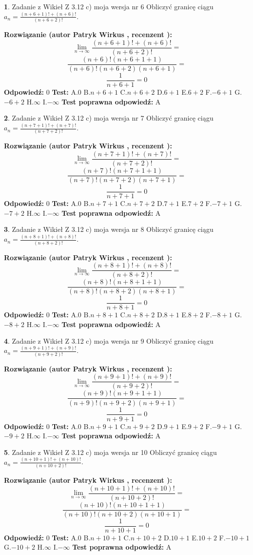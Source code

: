 \documentclass[12pt, a4paper]{article}
\theoremstyle{definition} %
\newtheorem{zad}{}
\newcommand{\zadStart}[1]{\begin{zad}#1\newline}
\newcommand{\zadStop}{\end{zad}}
\newcommand{\rozwStart}[2]{\noindent \textbf{Rozwiązanie (autor #1 , recenzent #2): }\newline}
\newcommand{\rozwStop}{\newline}
\newcommand{\odpStart}{\noindent \textbf{Odpowiedź:}\newline}
\newcommand{\odpStop}{\newline}
\newcommand{\testStart}{\noindent \textbf{Test:}\newline}
\newcommand{\testStop}{\newline}
\newcommand{\kluczStart}{\noindent \textbf{Test poprawna odpowiedź:}\newline}
\newcommand{\kluczStop}{\newline}
\begin{document}
\zadStart{Zadanie z Wikieł Z 3.12 c) moja wersja nr 6}
Obliczyć granicę ciągu $a_{n}=\frac{(n+6+1)!+(n+6)!}{(n+6+2)!}$.
\zadStop
\rozwStart{Patryk Wirkus}{}
$$\lim\limits_{n\to\infty}\frac{(n+6+1)!+(n+6)!}{(n+6+2)!}=$$
$$\frac{(n+6)!(n+6+1+1)}{(n+6)!(n+6+2)(n+6+1)}=$$
$$\frac{1}{n+6+1}= 0$$
\rozwStop
\odpStart
$0$
\odpStop
\testStart
A.$0$
B.$n+6+1$
C.$n+6+2$
D.$6+1$
E.$6+2$
F.$-6+1$
G.$-6+2$
H.$\infty$
I.$-\infty$
\testStop
\kluczStart
A
\kluczStop



\zadStart{Zadanie z Wikieł Z 3.12 c) moja wersja nr 7}
Obliczyć granicę ciągu $a_{n}=\frac{(n+7+1)!+(n+7)!}{(n+7+2)!}$.
\zadStop
\rozwStart{Patryk Wirkus}{}
$$\lim\limits_{n\to\infty}\frac{(n+7+1)!+(n+7)!}{(n+7+2)!}=$$
$$\frac{(n+7)!(n+7+1+1)}{(n+7)!(n+7+2)(n+7+1)}=$$
$$\frac{1}{n+7+1}= 0$$
\rozwStop
\odpStart
$0$
\odpStop
\testStart
A.$0$
B.$n+7+1$
C.$n+7+2$
D.$7+1$
E.$7+2$
F.$-7+1$
G.$-7+2$
H.$\infty$
I.$-\infty$
\testStop
\kluczStart
A
\kluczStop



\zadStart{Zadanie z Wikieł Z 3.12 c) moja wersja nr 8}
Obliczyć granicę ciągu $a_{n}=\frac{(n+8+1)!+(n+8)!}{(n+8+2)!}$.
\zadStop
\rozwStart{Patryk Wirkus}{}
$$\lim\limits_{n\to\infty}\frac{(n+8+1)!+(n+8)!}{(n+8+2)!}=$$
$$\frac{(n+8)!(n+8+1+1)}{(n+8)!(n+8+2)(n+8+1)}=$$
$$\frac{1}{n+8+1}= 0$$
\rozwStop
\odpStart
$0$
\odpStop
\testStart
A.$0$
B.$n+8+1$
C.$n+8+2$
D.$8+1$
E.$8+2$
F.$-8+1$
G.$-8+2$
H.$\infty$
I.$-\infty$
\testStop
\kluczStart
A
\kluczStop



\zadStart{Zadanie z Wikieł Z 3.12 c) moja wersja nr 9}
Obliczyć granicę ciągu $a_{n}=\frac{(n+9+1)!+(n+9)!}{(n+9+2)!}$.
\zadStop
\rozwStart{Patryk Wirkus}{}
$$\lim\limits_{n\to\infty}\frac{(n+9+1)!+(n+9)!}{(n+9+2)!}=$$
$$\frac{(n+9)!(n+9+1+1)}{(n+9)!(n+9+2)(n+9+1)}=$$
$$\frac{1}{n+9+1}= 0$$
\rozwStop
\odpStart
$0$
\odpStop
\testStart
A.$0$
B.$n+9+1$
C.$n+9+2$
D.$9+1$
E.$9+2$
F.$-9+1$
G.$-9+2$
H.$\infty$
I.$-\infty$
\testStop
\kluczStart
A
\kluczStop



\zadStart{Zadanie z Wikieł Z 3.12 c) moja wersja nr 10}
Obliczyć granicę ciągu $a_{n}=\frac{(n+10+1)!+(n+10)!}{(n+10+2)!}$.
\zadStop
\rozwStart{Patryk Wirkus}{}
$$\lim\limits_{n\to\infty}\frac{(n+10+1)!+(n+10)!}{(n+10+2)!}=$$
$$\frac{(n+10)!(n+10+1+1)}{(n+10)!(n+10+2)(n+10+1)}=$$
$$\frac{1}{n+10+1}= 0$$
\rozwStop
\odpStart
$0$
\odpStop
\testStart
A.$0$
B.$n+10+1$
C.$n+10+2$
D.$10+1$
E.$10+2$
F.$-10+1$
G.$-10+2$
H.$\infty$
I.$-\infty$
\testStop
\kluczStart
A
\kluczStop
\end{document}
